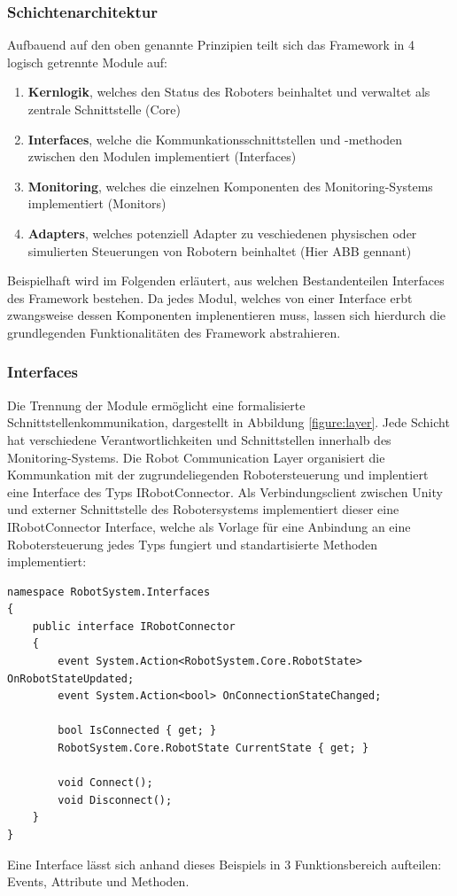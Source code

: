 \subsubsection{Schichtenarchitektur}
Aufbauend auf den oben genannte Prinzipien teilt sich das Framework in 4
logisch getrennte Module auf:
\begin{enumerate}
	\item \textbf{Kernlogik}, welches den Status des Roboters beinhaltet und verwaltet als
	      zentrale Schnittstelle (Core)
	\item \textbf{Interfaces}, welche die Kommunkationsschnittstellen und -methoden
	      zwischen den Modulen implementiert (Interfaces)
	\item \textbf{Monitoring}, welches die einzelnen Komponenten des Monitoring-Systems
	      implementiert (Monitors)
	\item \textbf{Adapters}, welches potenziell Adapter zu veschiedenen physischen oder
	      simulierten Steuerungen von Robotern beinhaltet (Hier ABB gennant)
\end{enumerate}
Beispielhaft wird im Folgenden erläutert, aus welchen Bestandenteilen Interfaces
des Framework bestehen. Da jedes Modul, welches von einer Interface erbt
zwangsweise dessen Komponenten implenentieren muss, lassen sich hierdurch die
grundlegenden Funktionalitäten des Framework abstrahieren.

\subsubsection{Interfaces}
Die Trennung der Module ermöglicht eine formalisierte
Schnittstellenkommunikation, dargestellt in Abbildung \ref{figure:layer}.
Jede Schicht hat verschiedene Verantwortlichkeiten und
Schnittstellen innerhalb des Monitoring-Systems. Die Robot Communication Layer
organisiert die Kommunkation mit der zugrundeliegenden Robotersteuerung und
implentiert eine Interface des Typs IRobotConnector. Als Verbindungsclient
zwischen Unity und externer Schnittstelle des Robotersystems implementiert
dieser eine IRobotConnector Interface, welche als Vorlage für eine Anbindung an
eine Robotersteuerung jedes Typs fungiert und standartisierte Methoden
implementiert:
\begin{lstlisting}  
namespace RobotSystem.Interfaces
{
    public interface IRobotConnector
    {
        event System.Action<RobotSystem.Core.RobotState> OnRobotStateUpdated;
        event System.Action<bool> OnConnectionStateChanged;
        
        bool IsConnected { get; }
        RobotSystem.Core.RobotState CurrentState { get; }
        
        void Connect();
        void Disconnect();
    }
}
\end{lstlisting}
Eine Interface lässt sich anhand dieses Beispiels in 3 Funktionsbereich aufteilen: Events, Attribute und Methoden.

